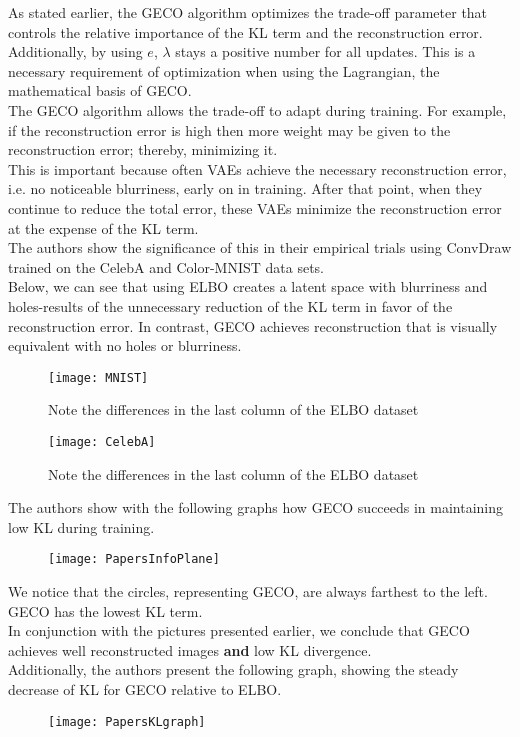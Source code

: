 As stated earlier, the GECO algorithm optimizes the trade-off parameter that controls the relative importance of the KL term and the reconstruction error.\\
Additionally, by using $e$, $\lambda$ stays a positive number for all updates. This is a necessary requirement of optimization when using the Lagrangian, the mathematical basis of GECO. \\
The GECO algorithm allows the trade-off to adapt during training. For example, if the reconstruction error is high then more weight may be given to the reconstruction error; thereby, minimizing it.\\
This is important because often VAEs achieve the necessary reconstruction error, i.e. no noticeable blurriness, early on in training. After that point, when they continue to reduce the total error, these VAEs minimize the reconstruction error at the expense of the KL term.\\
The authors show the significance of this in their empirical trials using ConvDraw trained on the CelebA and Color-MNIST data sets.\\
Below, we can see that using ELBO creates a latent space with blurriness and holes-results of the unnecessary reduction of the KL term in favor of the reconstruction error. In contrast, GECO achieves reconstruction that is visually equivalent with no holes or blurriness.\\

\begin{figure}[H]
\texttt{[image: MNIST]}
\caption{Note the differences in the last column of the ELBO dataset}
\centering
\end{figure}
\begin{figure}[H]
\texttt{[image: CelebA]}
\caption{Note the differences in the last column of the ELBO dataset}
\centering
\end{figure}
\hfill\break

The authors show with the following graphs how GECO succeeds in maintaining low KL during training.
\begin{figure}[H]
\texttt{[image: PapersInfoPlane]}
\centering
\end{figure}

We notice that the circles, representing GECO, are always farthest to the left. GECO has the lowest KL term.\\
In conjunction with the pictures presented earlier, we conclude that GECO achieves well reconstructed images \textbf{and} low KL divergence.\\

Additionally, the authors present the following graph, showing the steady decrease of KL for GECO relative to ELBO.
\begin{figure}[H]
\texttt{[image: PapersKLgraph]}
\centering
\end{figure}



	